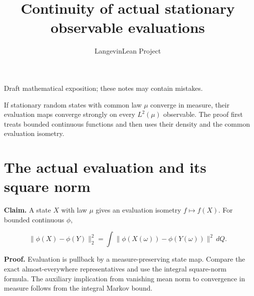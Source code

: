 \documentclass[11pt,a4paper]{article}
\title{\texorpdfstring{Continuity of actual stationary observable evaluations}{Continuity of actual stationary observable evaluations}}
\author{LangevinLean Project}
\date{}
\begin{document}
\maketitle
Draft mathematical exposition; these notes may contain mistakes.


If stationary random states with common law \(\mu\) converge in measure, their evaluation maps converge strongly on every \(L^2(\mu)\) observable. The proof first treats bounded continuous functions and then uses their density and the common evaluation isometry.


\section{\texorpdfstring{The actual evaluation and its square norm}{The actual evaluation and its square norm}}


\textbf{Claim.} A state \(X\) with law \(\mu\) gives an evaluation isometry \(f\mapsto f(X)\). For bounded continuous \(\phi\),

\[\|\phi(X)-\phi(Y)\|_2^2=\int\|\phi(X(\omega))-\phi(Y(\omega))\|^2\,dQ.\]

\textbf{Proof.} Evaluation is pullback by a measure-preserving state map. Compare the exact almost-everywhere representatives and use the integral square-norm formula. The auxiliary implication from vanishing mean norm to convergence in measure follows from the integral Markov bound.
\end{document}
